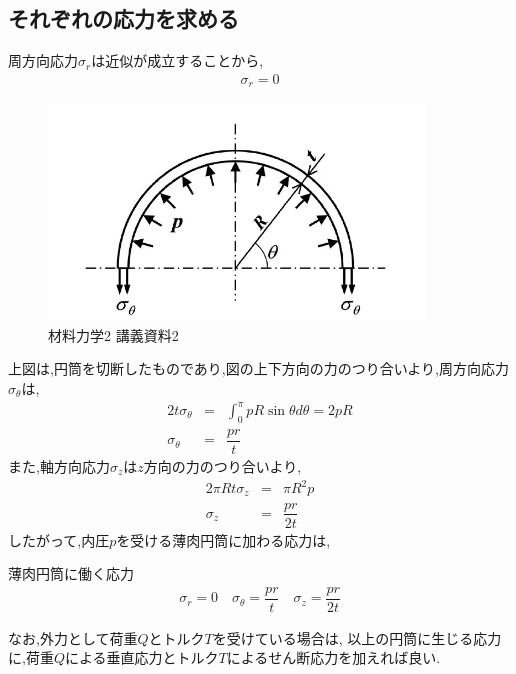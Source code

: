 \documentclass[a4paper]{jsarticle}
\begin{document}
\subsection{それぞれの応力を求める}
周方向応力$\sigma_r$は近似が成立することから,
\begin{eqnarray*}
    \sigma_r=0
\end{eqnarray*}
\begin{figure}[htbp]
    \begin{center}
        \includegraphics[width=100mm]{images/zairiki_image2.jpg}
        \caption{材料力学2 講義資料2}
    \end{center}
\end{figure}
上図は,円筒を切断したものであり,図の上下方向の力のつり合いより,周方向応力$\sigma_\theta$は,
\begin{eqnarray*}
    \displaystyle
    2t\sigma_\theta &=& \int^\pi_0 pR\sin\theta d\theta = 2pR\\
    \sigma_\theta &=&\dfrac{pr}{t}
\end{eqnarray*}
また,軸方向応力$\sigma_z$は$z$方向の力のつり合いより,
\begin{eqnarray*}
    2\pi Rt \sigma_z&=& \pi R^2p\\
    \sigma_z&=&\dfrac{pr}{2t}
\end{eqnarray*}
したがって,内圧$p$を受ける薄肉円筒に加わる応力は,
\begin{itembox}[l]{薄肉円筒に働く応力}
    \begin{eqnarray*}
        \sigma_r=0\quad
        \sigma_\theta =\dfrac{pr}{t}\quad
        \sigma_z=\dfrac{pr}{2t}
    \end{eqnarray*}
\end{itembox}
なお,外力として荷重$Q$とトルク$T$を受けている場合は,
以上の円筒に生じる応力に,荷重$Q$による垂直応力とトルク$T$によるせん断応力を加えれば良い.
\end{document}
